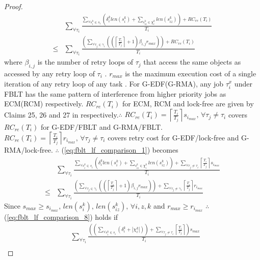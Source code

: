 \documentclass[prodmode,acmtecs]{acmsmall}
\begin{document}
\begin{compactenum}
\begin{proof}
\begin{eqnarray}
 & \sum_{\forall\tau_{i}}\frac{\sum_{\forall s_{i}^{k}\in s_{i}}\left(\delta_{i}^{k}len(s_{i}^{k})+\sum_{s_{iz}^{k}\in\chi_{i}^{k}}len(s_{iz}^{k})\right)+RC_{re}(T_{i})}{T_{i}}\label{eq:fblt_lf_comparison_1}\\
\le & \sum_{\forall\tau_{i}}\frac{\left(\sum_{\forall\tau_{j}\in\gamma_{i}}\left(\left(\left\lceil \frac{T_{i}}{T_{j}}\right\rceil +1\right)\beta_{i,j}r_{max}\right)\right)+RC_{re}(T_{i})}{T_{i}}\nonumber 
\end{eqnarray}
where $\beta_{i,j}$ is the number of retry loops of $\tau_{j}$ that
access the same objects as accessed by any retry loop of $\tau_{i}$
\cite{key-5}. $r_{max}$ is the maximum execution cost of a single
iteration of any retry loop of any task \cite{key-5}. For G-EDF(G-RMA),
any job $\tau_{i}^{x}$ under FBLT has the same pattern of interference
from higher priority jobs as ECM(RCM) respectively. $RC_{re}(T_{i})$
for ECM, RCM and lock-free are given by Claims 25, 26 and 27 in \cite{shambake_phd_proposal}
respectively.$\therefore$ $RC_{re}(T_{i})=\left\lceil \frac{T_{i}}{T_{j}}\right\rceil s_{i_{max}},\,\forall\tau_{j}\neq\tau_{i}$
covers $RC_{re}(T_{i})$ for G-EDF/FBLT and G-RMA/FBLT. $RC_{re}(T_{i})=\left\lceil \frac{T_{i}}{T_{j}}\right\rceil r_{i_{max}},\,\forall\tau_{j}\neq\tau_{i}$
covers retry cost for G-EDF/lock-free and G-RMA/lock-free. $\therefore$
(\ref{eq:fblt_lf_comparison_1}) becomes 
\begin{eqnarray}
 & \sum_{\forall\tau_{i}}\frac{\sum_{\forall s_{i}^{k}\in s_{i}}\left(\delta_{i}^{k}len(s_{i}^{k})+\sum_{s_{iz}^{k}\in\chi_{i}^{k}}len(s_{iz}^{k})\right)+\sum_{\forall\tau_{j}\neq\tau_{i}}\left\lceil \frac{T_{i}}{T_{j}}\right\rceil s_{i_{max}}}{T_{i}}\label{eq:fblt_lf_comparison_8}\\
\le & \sum_{\forall\tau_{i}}\frac{\left(\sum_{\forall\tau_{j}\in\gamma_{i}}\left(\left(\left\lceil \frac{T_{i}}{T_{j}}\right\rceil +1\right)\beta_{i,j}r_{max}\right)\right)+\sum_{\forall\tau_{j}\neq\gamma_{i}}\left\lceil \frac{T_{i}}{T_{j}}\right\rceil r_{i_{max}}}{T_{i}}\nonumber 
\end{eqnarray}
Since $s_{max}\ge s_{i_{max}},\, len(s_{i}^{k}),\, len(s_{iz}^{k}),\,\forall i,z,k$
and $r_{max}\ge r_{i_{max}}$ $\therefore$ (\ref{eq:fblt_lf_comparison_8})
holds if 
\begin{eqnarray}
 & \sum_{\forall\tau_{i}}\frac{\left(\left(\sum_{\forall s_{i}^{k}\in s_{i}}\left(\delta_{i}^{k}+|\chi_{i}^{k}|\right)\right)+\sum_{\forall\tau_{j}\neq\tau_{i}}\left\lceil \frac{T_{i}}{T_{j}}\right\rceil \right)s_{max}}{T_{i}}\label{eq:fblt_lf_comparison_6}\\

\end{eqnarray}
\end{proof}
\end{compactenum}
\end{document}
